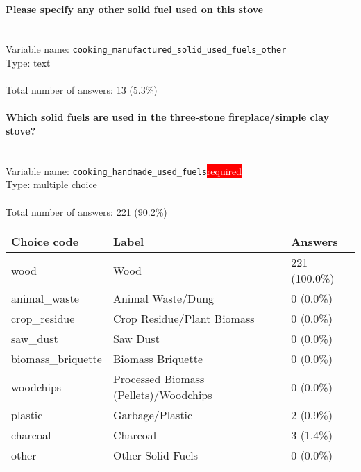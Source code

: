 \documentclass[11.5pt, a4paper]{scrartcl}
\begin{document}
\paragraph{Please specify any other solid fuel used on this stove}
\  \\Variable name: \texttt{cooking\_manufactured\_solid\_used\_fuels\_other}\\
Type: text\\
\\Total number of answers: 13 (5.3\%)
\\[0.2em]\paragraph{Which solid fuels are used in the three-stone fireplace/simple clay stove?}
\  \\Variable name: \texttt{cooking\_handmade\_used\_fuels}\hfill\colorbox{red}{\small{\textcolor{white}{required}}}\\
 Type: multiple choice\\
\\Total number of answers: 221 (90.2\%)
\\[0.2em] \begin{tabular}{p{4cm}|p{8cm}|p{3cm}}
Choice code & Label & Answers \\
\hline
wood & Wood& \cellcolor{color4}221 (100.0\%)\\
\cellcolor{mygray} animal\_waste & \cellcolor{mygray}Animal Waste/Dung & \cellcolor{color0}0 (0.0\%)\\
crop\_residue & Crop Residue/Plant Biomass& \cellcolor{color0}0 (0.0\%)\\
\cellcolor{mygray} saw\_dust & \cellcolor{mygray}Saw Dust & \cellcolor{color0}0 (0.0\%)\\
biomass\_briquette & Biomass Briquette& \cellcolor{color0}0 (0.0\%)\\
\cellcolor{mygray} woodchips & \cellcolor{mygray}Processed Biomass (Pellets)/Woodchips & \cellcolor{color0}0 (0.0\%)\\
plastic & Garbage/Plastic& \cellcolor{color0}2 (0.9\%)\\
\cellcolor{mygray} charcoal & \cellcolor{mygray}Charcoal & \cellcolor{color0}3 (1.4\%)\\
other & Other Solid Fuels& \cellcolor{color0}0 (0.0\%)\\
\end{tabular}
\end{document}
